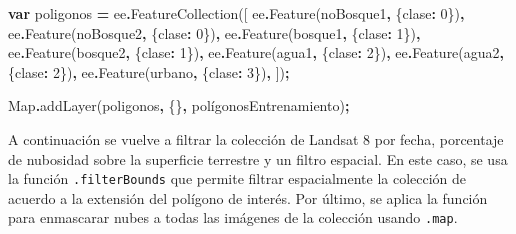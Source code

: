 \documentclass[
  12pt,
  letterpaper,
  twoside]{book}
\newenvironment{Shaded}{\begin{snugshade}}{\end{snugshade}}
\newcommand{\BuiltInTok}[1]{#1}
\newcommand{\DecValTok}[1]{\textcolor[rgb]{0.00,0.00,0.81}{#1}}
\newcommand{\FunctionTok}[1]{\textcolor[rgb]{0.00,0.00,0.00}{#1}}
\newcommand{\KeywordTok}[1]{\textcolor[rgb]{0.13,0.29,0.53}{\textbf{#1}}}
\newcommand{\NormalTok}[1]{#1}
\newcommand{\OperatorTok}[1]{\textcolor[rgb]{0.81,0.36,0.00}{\textbf{#1}}}
\newcommand{\StringTok}[1]{\textcolor[rgb]{0.31,0.60,0.02}{#1}}
\begin{document}
\begin{Shaded}
\begin{Highlighting}[]
\KeywordTok{var}\NormalTok{ poligonos }\OperatorTok{=}\NormalTok{ ee}\OperatorTok{.}\FunctionTok{FeatureCollection}\NormalTok{([}
\NormalTok{  ee}\OperatorTok{.}\FunctionTok{Feature}\NormalTok{(noBosque1}\OperatorTok{,}\NormalTok{ \{}\StringTok{\textquotesingle{}clase\textquotesingle{}}\OperatorTok{:} \DecValTok{0}\NormalTok{\})}\OperatorTok{,}
\NormalTok{  ee}\OperatorTok{.}\FunctionTok{Feature}\NormalTok{(noBosque2}\OperatorTok{,}\NormalTok{ \{}\StringTok{\textquotesingle{}clase\textquotesingle{}}\OperatorTok{:} \DecValTok{0}\NormalTok{\})}\OperatorTok{,}
\NormalTok{  ee}\OperatorTok{.}\FunctionTok{Feature}\NormalTok{(bosque1}\OperatorTok{,}\NormalTok{ \{}\StringTok{\textquotesingle{}clase\textquotesingle{}}\OperatorTok{:} \DecValTok{1}\NormalTok{\})}\OperatorTok{,}
\NormalTok{  ee}\OperatorTok{.}\FunctionTok{Feature}\NormalTok{(bosque2}\OperatorTok{,}\NormalTok{ \{}\StringTok{\textquotesingle{}clase\textquotesingle{}}\OperatorTok{:} \DecValTok{1}\NormalTok{\})}\OperatorTok{,}
\NormalTok{  ee}\OperatorTok{.}\FunctionTok{Feature}\NormalTok{(agua1}\OperatorTok{,}\NormalTok{ \{}\StringTok{\textquotesingle{}clase\textquotesingle{}}\OperatorTok{:} \DecValTok{2}\NormalTok{\})}\OperatorTok{,}
\NormalTok{  ee}\OperatorTok{.}\FunctionTok{Feature}\NormalTok{(agua2}\OperatorTok{,}\NormalTok{ \{}\StringTok{\textquotesingle{}clase\textquotesingle{}}\OperatorTok{:} \DecValTok{2}\NormalTok{\})}\OperatorTok{,}
\NormalTok{  ee}\OperatorTok{.}\FunctionTok{Feature}\NormalTok{(urbano}\OperatorTok{,}\NormalTok{ \{}\StringTok{\textquotesingle{}clase\textquotesingle{}}\OperatorTok{:} \DecValTok{3}\NormalTok{\})}\OperatorTok{,}
\NormalTok{])}\OperatorTok{;}

\BuiltInTok{Map}\OperatorTok{.}\FunctionTok{addLayer}\NormalTok{(poligonos}\OperatorTok{,}\NormalTok{ \{\}}\OperatorTok{,} \StringTok{\textquotesingle{}polígonosEntrenamiento\textquotesingle{}}\NormalTok{)}\OperatorTok{;}
\end{Highlighting}
\end{Shaded}

A continuación se vuelve a filtrar la colección de Landsat 8 por fecha, porcentaje de nubosidad sobre la superficie terrestre y un filtro espacial. En este caso, se usa la función \texttt{.filterBounds} que permite filtrar espacialmente la colección de acuerdo a la extensión del polígono de interés. Por último, se aplica la función para enmascarar nubes a todas las imágenes de la colección usando \texttt{.map}.
\end{document}
